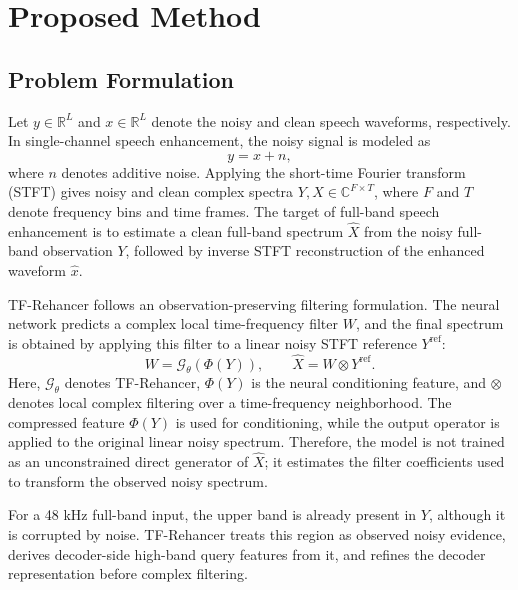 \chapter{Proposed Method}
\label{chap:proposed_method}

\section{Problem Formulation}
\label{sec:method_problem}

Let \(y \in \mathbb{R}^{L}\) and \(x \in \mathbb{R}^{L}\) denote the noisy and clean speech waveforms, respectively. In single-channel speech enhancement, the noisy signal is modeled as
\begin{equation}
    y = x + n,
\end{equation}
where \(n\) denotes additive noise. Applying the short-time Fourier transform (STFT) gives noisy and clean complex spectra \(Y,X\in\mathbb{C}^{F\times T}\), where \(F\) and \(T\) denote frequency bins and time frames. The target of full-band speech enhancement is to estimate a clean full-band spectrum \(\hat{X}\) from the noisy full-band observation \(Y\), followed by inverse STFT reconstruction of the enhanced waveform \(\hat{x}\).

TF-Rehancer follows an observation-preserving filtering formulation. The neural network predicts a complex local time-frequency filter \(W\), and the final spectrum is obtained by applying this filter to a linear noisy STFT reference \(Y^{\mathrm{ref}}\):
\begin{equation}
    W = \mathcal{G}_{\theta}(\Phi(Y)), \qquad
    \hat{X} = W \otimes Y^{\mathrm{ref}}.
\end{equation}
Here, \(\mathcal{G}_{\theta}\) denotes TF-Rehancer, \(\Phi(Y)\) is the neural conditioning feature, and \(\otimes\) denotes local complex filtering over a time-frequency neighborhood. The compressed feature \(\Phi(Y)\) is used for conditioning, while the output operator is applied to the original linear noisy spectrum. Therefore, the model is not trained as an unconstrained direct generator of \(\hat{X}\); it estimates the filter coefficients used to transform the observed noisy spectrum.

For a 48 kHz full-band input, the upper band is already present in \(Y\), although it is corrupted by noise. TF-Rehancer treats this region as observed noisy evidence, derives decoder-side high-band query features from it, and refines the decoder representation before complex filtering.

